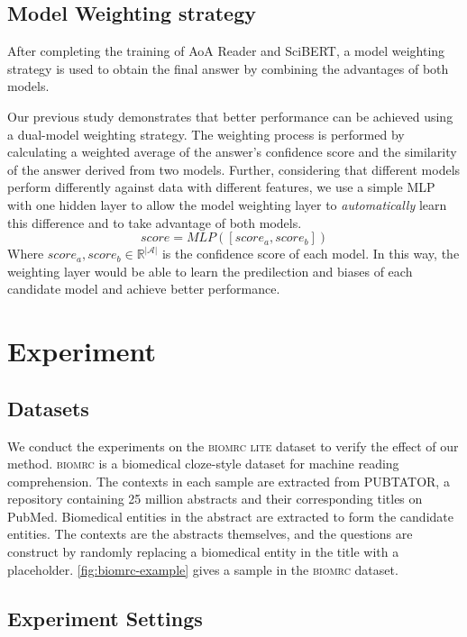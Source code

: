 \documentclass[sigconf, screen]{acmart}
\newcommand{\biomrc}{{\scshape{biomrc}}\xspace}
\newcommand{\biomrclite}{{\scshape{biomrc lite}}\xspace}
\newcommand{\pubmed}{PubMed\xspace}
\newcommand{\scibert}{Sci\-BERT\xspace}
\newcommand{\aoa}{AoA Reader\xspace}
\begin{document}
\subsection{Model Weighting strategy}
After completing the training of \aoa and \scibert, a model weighting strategy is used to obtain the final answer by combining the advantages of both models.



Our previous study \cite{duDualModelWeighting2021} demonstrates that better performance can be achieved using a dual-model weighting strategy. The weighting process is performed by calculating a weighted average of the answer's confidence score and the similarity of the answer derived from two models. Further, considering that different models perform differently against data with different features, we use a simple MLP with one hidden layer to allow the model weighting layer to \emph{automatically} learn this difference and to take advantage of both models.
\begin{equation}
    score = MLP([score_a, score_b])
\end{equation}
Where $score_a, score_b \in \mathbb{R}^{|\mathcal{A}|}$ is the confidence score of each model.
In this way, the weighting layer would be able to learn the predilection and biases of each candidate model and achieve better performance.


\section{Experiment}
\subsection{Datasets}
We conduct the experiments on the \biomrclite dataset \cite{pappasBioMRCDatasetBiomedical2020} to verify the effect of our method. \biomrc is a biomedical cloze-style dataset for machine reading comprehension. The contexts in each sample are extracted from PUBTATOR, a repository containing 25 million abstracts and their corresponding titles on \pubmed. Biomedical entities in the abstract are extracted to form the candidate entities. The contexts are the abstracts themselves, and the questions are construct by randomly replacing a biomedical entity in the title with a placeholder. \cref{fig:biomrc-example} gives a sample in the \biomrc dataset.

\subsection{Experiment Settings}
\end{document}
